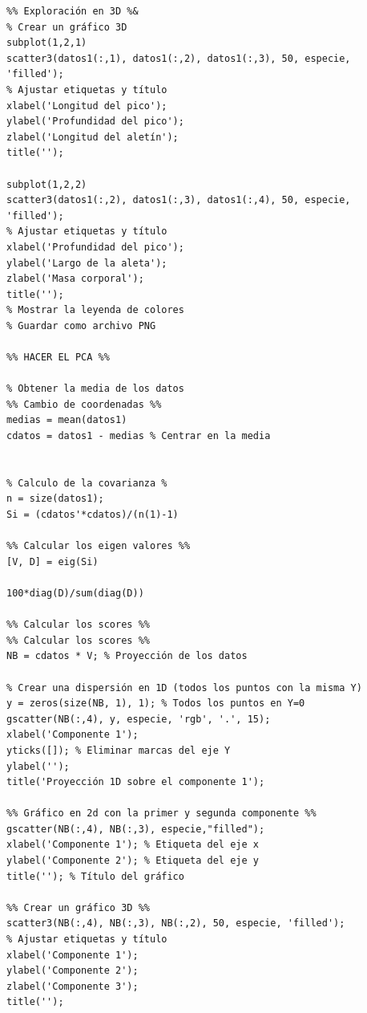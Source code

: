 \documentclass[11pt, letterpaper]{article}
\begin{document}
\begin{verbatim}
%% Exploración en 3D %&
% Crear un gráfico 3D
subplot(1,2,1)
scatter3(datos1(:,1), datos1(:,2), datos1(:,3), 50, especie, 'filled'); 
% Ajustar etiquetas y título
xlabel('Longitud del pico');
ylabel('Profundidad del pico');
zlabel('Longitud del aletín');
title('');

subplot(1,2,2)
scatter3(datos1(:,2), datos1(:,3), datos1(:,4), 50, especie, 'filled'); 
% Ajustar etiquetas y título
xlabel('Profundidad del pico');
ylabel('Largo de la aleta');
zlabel('Masa corporal');
title('');
% Mostrar la leyenda de colores
% Guardar como archivo PNG

%% HACER EL PCA %%

% Obtener la media de los datos
%% Cambio de coordenadas %%
medias = mean(datos1)
cdatos = datos1 - medias % Centrar en la media


% Calculo de la covarianza %
n = size(datos1);
Si = (cdatos'*cdatos)/(n(1)-1)

%% Calcular los eigen valores %%
[V, D] = eig(Si)

100*diag(D)/sum(diag(D))

%% Calcular los scores %%
%% Calcular los scores %%
NB = cdatos * V; % Proyección de los datos

% Crear una dispersión en 1D (todos los puntos con la misma Y)
y = zeros(size(NB, 1), 1); % Todos los puntos en Y=0
gscatter(NB(:,4), y, especie, 'rgb', '.', 15);
xlabel('Componente 1');
yticks([]); % Eliminar marcas del eje Y
ylabel('');
title('Proyección 1D sobre el componente 1');

%% Gráfico en 2d con la primer y segunda componente %%
gscatter(NB(:,4), NB(:,3), especie,"filled");
xlabel('Componente 1'); % Etiqueta del eje x
ylabel('Componente 2'); % Etiqueta del eje y
title(''); % Título del gráfico

%% Crear un gráfico 3D %%
scatter3(NB(:,4), NB(:,3), NB(:,2), 50, especie, 'filled'); 
% Ajustar etiquetas y título
xlabel('Componente 1');
ylabel('Componente 2');
zlabel('Componente 3');
title('');
\end{verbatim}
	
	
	
	
\end{document}
